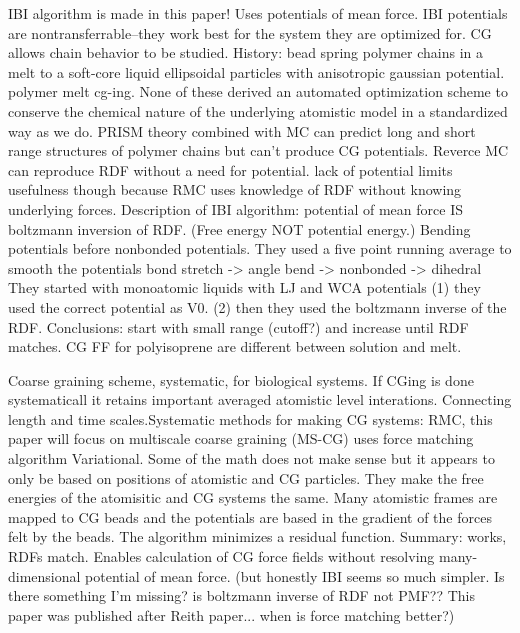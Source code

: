 \documentclass{article}
\begin{document}
\cite{Reith2003a}
IBI algorithm is made in this paper! Uses potentials of mean force. IBI potentials are nontransferrable--they work best for the system they are optimized for.
CG allows chain behavior to be studied. History: bead spring polymer chains in a melt to a soft-core liquid ellipsoidal particles with anisotropic gaussian potential. polymer melt cg-ing. None of these derived an automated optimization scheme to conserve the chemical nature of the underlying atomistic model in a standardized way as we do.
PRISM theory combined with MC can predict long and short range structures of polymer chains but can't produce CG potentials.
Reverce MC can reproduce RDF without a need for potential. lack of potential limits usefulness though because RMC uses knowledge of RDF without knowing underlying forces.
Description of IBI algorithm: potential of mean force IS boltzmann inversion of RDF. (Free energy NOT potential energy.) Bending potentials before nonbonded potentials.
They used a five point running average to smooth the potentials
bond stretch -> angle bend -> nonbonded -> dihedral
They started with monoatomic liquids with LJ and WCA potentials (1) they used the correct potential as V0. (2) then they used the boltzmann inverse of the RDF. 
Conclusions:
start with small range (cutoff?) and increase until RDF matches. CG FF for polyisoprene are different between solution and melt.

\cite{Ayton2007a}
Coarse graining scheme, systematic, for biological systems.
If CGing is done systematicall it retains important averaged atomistic level interations. Connecting length and time scales.Systematic methods for making CG systems: RMC, this paper will focus on multiscale coarse graining (MS-CG) uses force matching algorithm
Variational. Some of the math does not make sense but it appears to only be based on positions of atomistic and CG particles. They make the free energies of the atomisitic and CG systems the same. Many atomistic frames are mapped to CG beads and the potentials are based in the gradient of the forces felt by the beads. The algorithm minimizes a residual function.
Summary: works, RDFs match. Enables calculation of CG force fields without resolving many-dimensional potential of mean force. (but honestly IBI seems so much simpler. Is there something I'm missing? is boltzmann inverse of RDF not PMF?? This paper was published after Reith paper... when is force matching better?)
\end{document}
